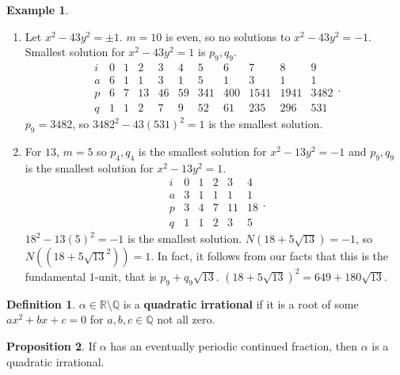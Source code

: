 \documentclass{article}
\newcommand{\Q}{\mathbb{Q}}
\newcommand{\R}{\mathbb{R}}
\newcommand{\rb}[1]{\left( #1 \right)}
\theoremstyle{definition}\newtheorem{definition}{Definition}
\theoremstyle{definition}\newtheorem{remark}[definition]{Remark}
\theoremstyle{definition}\newtheorem*{example}{Example}
\theoremstyle{definition}\newtheorem*{note}{Note}
\newtheorem{proposition}[definition]{Proposition}
\begin{document}
\begin{example}
\hfill
\begin{enumerate}
\item Let $ x^2 - 43y^2 = \pm 1 $. $ m = 10 $ is even, so no solutions to $ x^2 - 43y^2 = -1 $. Smallest solution for $ x^2 - 43y^2 = 1 $ is $ p_9, q_9 $.
$$
\begin{array}{c|cccccccccc}
i & 0 & 1 & 2 & 3 & 4 & 5 & 6 & 7 & 8 & 9 \\
\hline
a & 6 & 1 & 1 & 3 & 1 & 5 & 1 & 3 & 1 & 1 \\
p & 6 & 7 & 13 & 46 & 59 & 341 & 400 & 1541 & 1941 & 3482 \\
q & 1 & 1 & 2 & 7 & 9 & 52 & 61 & 235 & 296 & 531
\end{array}.
$$
$ p_9 = 3482 $, so $ 3482^2 - 43\rb{531}^2 = 1 $ is the smallest solution.
\item For $ 13 $, $ m = 5 $ so $ p_4, q_4 $ is the smallest solution for $ x^2 - 13y^2 = -1 $ and $ p_9, q_9 $ is the smallest solution for $ x^2 - 13y^2 = 1 $.
$$
\begin{array}{c|ccccc}
i & 0 & 1 & 2 & 3 & 4 \\
\hline
a & 3 & 1 & 1 & 1 & 1 \\
p & 3 & 4 & 7 & 11 & 18 \\
q & 1 & 1 & 2 & 3 & 5
\end{array}.
$$
$ 18^2 - 13\rb{5}^2 = -1 $ is the smallest solution. $ N\rb{18 + 5\sqrt{13}} = -1 $, so $ N\rb{\rb{18 + 5\sqrt{13}^2}} = 1 $. In fact, it follows from our facts that this is the fundamental $ 1 $-unit, that is $ p_9 + q_9\sqrt{13} $. $ \rb{18 + 5\sqrt{13}}^2 = 649 + 180\sqrt{13} $.
\end{enumerate}
\end{example}


\begin{definition}
$ \alpha \in \R \setminus \Q $ is a \textbf{quadratic irrational} if it is a root of some $ ax^2 + bx + c = 0 $ for $ a, b, c \in \Q $ not all zero.
\end{definition}

\begin{proposition}
If $ \alpha $ has an eventually periodic continued fraction, then $ \alpha $ is a quadratic irrational.
\end{proposition}
\end{document}

